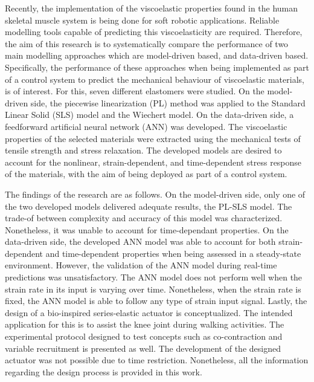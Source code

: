 


\begin{abstracts}        %


Recently, the implementation of the viscoelastic properties found in the human skeletal muscle system is being done for soft robotic applications. Reliable modelling tools capable of predicting this viscoelasticity are required. Therefore, the aim of this research is to systematically compare the performance of two main modelling approaches which are model-driven based, and data-driven based. Specifically, the performance of these approaches when being implemented as part of a control system to predict the mechanical behaviour of viscoelastic materials, is of interest. For this, seven different elastomers were studied. On the model-driven side, the piecewise linearization (PL) method was applied to the Standard Linear Solid (SLS) model and the Wiechert model. On the data-driven side, a feedforward artificial neural network (ANN) was developed. The viscoelastic properties of the selected materials were extracted using the mechanical tests of tensile strength and stress relaxation. The developed models are desired to account for the nonlinear, strain-dependent, and time-dependent stress response of the materials, with the aim of being deployed as part of a control system.

The findings of the research are as follows. On the model-driven side, only one of the two developed models delivered adequate results, the PL-SLS model. The trade-of between complexity and accuracy of this model was characterized. Nonetheless, it was unable to account for time-dependant properties. On the data-driven side, the developed ANN model was able to account for both strain-dependent and time-dependent properties when being assessed in a steady-state environment. However, the validation of the ANN model during real-time predictions was unsatisfactory. The ANN model does not perform well when the strain rate in its input is varying over time. Nonetheless, when the strain rate is fixed, the ANN model is able to follow any type of strain input signal. Lastly, the design of a bio-inspired series-elastic actuator is conceptualized. The intended application for this is to assist the knee joint during walking activities. The experimental protocol designed to test concepts such as co-contraction and variable recruitment is presented as well. The development of the designed actuator was not possible due to time restriction. Nonetheless, all the information regarding the design process is provided in this work.


\end{abstracts}
